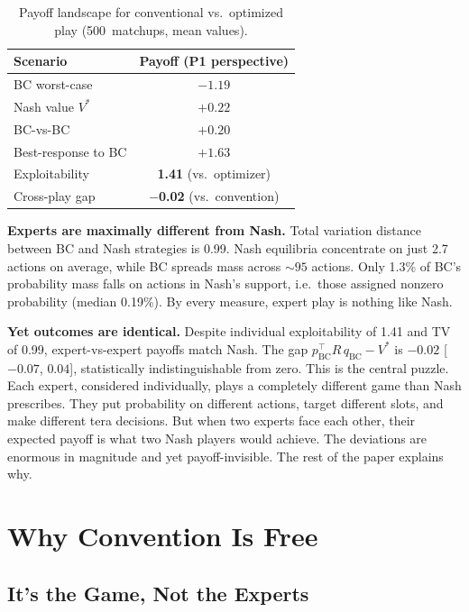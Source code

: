 \documentclass{article}
\begin{document}
\begin{table}[t]
\caption{Payoff landscape for conventional vs.\ optimized play (500~matchups, mean values).}
\label{tab:triangle}
\vskip 0.1in
\centering
\small
\begin{tabular}{lc}
\toprule
Scenario & Payoff (P1 perspective) \\
\midrule
BC worst-case & $-1.19$ \\
Nash value $V^*$ & $+0.22$ \\
BC-vs-BC & $+0.20$ \\
Best-response to BC & $+1.63$ \\
\midrule
Exploitability & \textbf{1.41} (vs.\ optimizer) \\
Cross-play gap & \textbf{$-$0.02} (vs.\ convention) \\
\bottomrule
\end{tabular}
\vskip -0.1in
\end{table}

\textbf{Experts are maximally different from Nash.} Total variation distance between BC and Nash strategies is 0.99. Nash equilibria concentrate on just 2.7 actions on average, while BC spreads mass across ${\sim}95$ actions. Only 1.3\% of BC's probability mass falls on actions in Nash's support, i.e.\ those assigned nonzero probability (median 0.19\%). By every measure, expert play is nothing like Nash.

\textbf{Yet outcomes are identical.} Despite individual exploitability of 1.41 and TV of 0.99, expert-vs-expert payoffs match Nash. The gap $p_\text{BC}^\top R\, q_\text{BC} - V^*$ is $-0.02$ [$-0.07$, $0.04$], statistically indistinguishable from zero. This is the central puzzle. Each expert, considered individually, plays a completely different game than Nash prescribes. They put probability on different actions, target different slots, and make different tera decisions. But when two experts face each other, their expected payoff is what two Nash players would achieve. The deviations are enormous in magnitude and yet payoff-invisible. The rest of the paper explains why.

\section{Why Convention Is Free}
\label{sec:free}

\subsection{It's the Game, Not the Experts}
\end{document}
